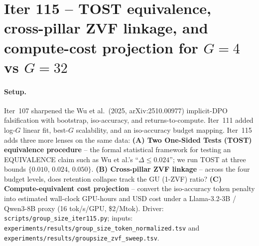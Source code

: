 \section{Iter 115 -- TOST equivalence, cross-pillar ZVF linkage, and
compute-cost projection for $G{=}4$ vs $G{=}32$}
\label{sec:group-size-iter115}

\paragraph{Setup.}
Iter~107 sharpened the Wu et al.\ (2025, arXiv:2510.00977) implicit-DPO
falsification with bootstrap, iso-accuracy, and returns-to-compute.
Iter~111 added log-$G$ linear fit, best-$G$ scalability, and an
iso-accuracy budget mapping.  Iter~115 adds three more lenses on the
same data:
\textbf{(A) Two One-Sided Tests (TOST) equivalence procedure} --
the formal statistical framework for testing an EQUIVALENCE claim
such as Wu et al.'s ``$\Delta \le 0.024$''; we run TOST at three
bounds $\{0.010,\,0.024,\,0.050\}$.
\textbf{(B) Cross-pillar ZVF linkage} -- across the four budget
levels, does retention collapse track the GU (1-ZVF) ratio?
\textbf{(C) Compute-equivalent cost projection} -- convert the
iso-accuracy token penalty into estimated wall-clock GPU-hours and
USD cost under a Llama-3.2-3B / Qwen3-8B proxy
(16 tok/s/GPU, \$2/Mtok).  Driver:
\texttt{scripts/group\_size\_iter115.py}; inputs:
\texttt{experiments/results/group\_size\_token\_normalized.tsv} and
\texttt{experiments/results/groupsize\_zvf\_sweep.tsv}.

